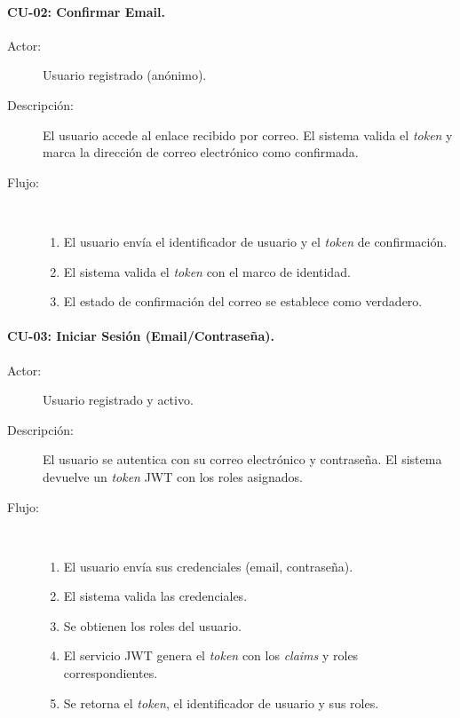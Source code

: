 \paragraph{CU-02: Confirmar Email.}
\begin{description}
    \item[Actor:] Usuario registrado (anónimo).
    \item[Descripción:] El usuario accede al enlace recibido por correo. El sistema valida el \textit{token} y marca la dirección de correo electrónico como confirmada.
    \item[Flujo:]~
    \begin{enumerate}
        \item El usuario envía el identificador de usuario y el \textit{token} de confirmación.
        \item El sistema valida el \textit{token} con el marco de identidad.
        \item El estado de confirmación del correo se establece como verdadero.
    \end{enumerate}
\end{description}

\paragraph{CU-03: Iniciar Sesión (Email/Contraseña).}
\begin{description}
    \item[Actor:] Usuario registrado y activo.
    \item[Descripción:] El usuario se autentica con su correo electrónico y contraseña. El sistema devuelve un \textit{token} JWT con los roles asignados.
    \item[Flujo:]~
    \begin{enumerate}
        \item El usuario envía sus credenciales (email, contraseña).
        \item El sistema valida las credenciales.
        \item Se obtienen los roles del usuario.
        \item El servicio JWT genera el \textit{token} con los \textit{claims} y roles correspondientes.
        \item Se retorna el \textit{token}, el identificador de usuario y sus roles.
    \end{enumerate}
\end{description}

